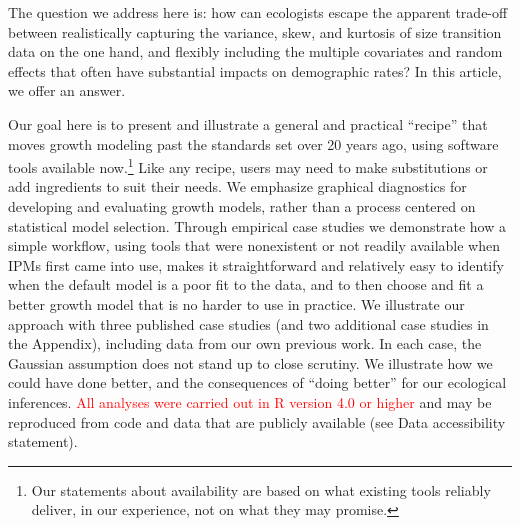 \documentclass[12pt]{article}
\newcommand{\new}{\textcolor{red}}
\begin{document}
The question we address here is: how can ecologists escape the apparent trade-off between realistically capturing the variance, skew, and kurtosis of size transition data on the one hand, and flexibly including the multiple covariates and random effects that often have substantial impacts on demographic rates?  
In this article, we offer an answer. 

Our goal here is to present and illustrate a general and practical ``recipe'' that moves growth modeling past the standards set over 20 years ago, using software tools available now.\footnote{Our statements about availability are based on what existing tools reliably deliver, in our experience, not on what they may promise.} 
Like any recipe, users may need to make substitutions or add ingredients to suit their needs. 
We emphasize graphical diagnostics for developing and evaluating growth models, rather than a process centered on statistical model selection. 
Through empirical case studies we demonstrate how a simple workflow, using tools that were nonexistent or not readily available when IPMs first came into use, makes it straightforward and relatively easy to identify when the default model is a poor fit to the data, and to then choose and fit a better growth model that is no harder to use in practice. 
We illustrate our approach with three published case studies (and two additional case studies in the Appendix), including data from our own previous work.
In each case, the Gaussian assumption does not stand up to close scrutiny. 
We illustrate how we could have done better, and the consequences of ``doing better'' for our ecological inferences. 
\new{All analyses were carried out in R \citep{r-core} version 4.0 or higher} and may be reproduced from code and data that are 
publicly available (see Data accessibility statement). 
\end{document}
